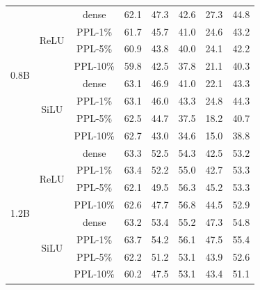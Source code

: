 \documentclass{article} %
\begin{document}
\begin{table}[ht]
\begin{center}
\begin{tabular}{c|c|c|ccccc}
\midrule
\multirow{8}{*}{0.8B} & \multirow{4}{*}{ReLU} 
& dense  & 62.1 & 47.3 & 42.6 & 27.3 & 44.8 \\
& & PPL-1\% & 61.7 & 45.7 & 41.0 & 24.6 & 43.2 \\
& & PPL-5\% & 60.9 & 43.8 & 40.0 & 24.1 & 42.2 \\
& & PPL-10\% & 59.8 & 42.5 & 37.8 & 21.1 & 40.3 \\
\cmidrule{2-8}
& \multirow{4}{*}{SiLU} 
& dense  & 63.1 & 46.9 & 41.0 & 22.1 & 43.3 \\
& & PPL-1\% & 63.1 & 46.0 & 43.3 & 24.8 & 44.3 \\
& & PPL-5\% & 62.5 & 44.7 & 37.5 & 18.2 & 40.7 \\
& & PPL-10\% & 62.7 & 43.0 & 34.6 & 15.0 & 38.8 \\

\midrule
\multirow{8}{*}{1.2B} & \multirow{4}{*}{ReLU} 
& dense  & 63.3 & 52.5 & 54.3 & 42.5 & 53.2 \\
& & PPL-1\% & 63.4 & 52.2 & 55.0 & 42.7 & 53.3 \\
& & PPL-5\% & 62.1 & 49.5 & 56.3 & 45.2 & 53.3 \\
& & PPL-10\% & 62.6 & 47.7 & 56.8 & 44.5 & 52.9 \\
\cmidrule{2-8}
& \multirow{4}{*}{SiLU} 
& dense  & 63.2 & 53.4 & 55.2 & 47.3 & 54.8 \\
& & PPL-1\% & 63.7 & 54.2 & 56.1 & 47.5 & 55.4 \\
& & PPL-5\% & 62.2 & 51.2 & 53.1 & 43.9 & 52.6 \\
& & PPL-10\% & 60.2 & 47.5 & 53.1 & 43.4 & 51.1 \\

\bottomrule
\end{tabular}
\end{center}
\end{table}
\end{document}
